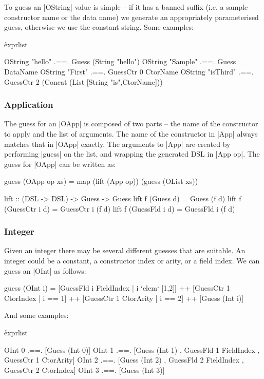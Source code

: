 \documentclass[preprint,draft]{sigplanconf}
\begin{document}
To guess an |OString| value is simple -- if it has a banned suffix (i.e. a sample constructor name or the data name) we generate an appropriately parameterised guess, otherwise we use the constant string. Some examples:

\h{exprlist}\begin{code}
OString "hello" .==. Guess (String "hello")
OString "Sample" .==. Guess DataName
OString "First" .==. GuessCtr 0 CtorName
OString "isThird" .==. GuessCtr 2
    (Concat (List [String "is",CtorName]))
\end{code}

\subsubsection{Application}

The guess for an |OApp| is composed of two parts -- the name of the constructor to apply and the list of arguments. The name of the constructor in |App| always matches that in |OApp| exactly. The arguments to |App| are created by performing |guess| on the list, and wrapping the generated DSL in |App op|. The guess for |OApp| can be written as:

\begin{code}
guess (OApp op xs) = map (lift (App op)) (guess (OList xs))

lift :: (DSL -> DSL) -> Guess -> Guess
lift f (Guess       d) = Guess       (f d)
lift f (GuessCtr i  d) = GuessCtr i  (f d)
lift f (GuessFld i  d) = GuessFld i  (f d)
\end{code}

\subsubsection{Integer}

Given an integer there may be several different guesses that are suitable. An integer could be a constant, a constructor index or arity, or a field index. We can guess an |OInt| as follows:

\begin{code}
guess (OInt i) =
    [GuessFld i FieldIndex | i `elem` [1,2]] ++
    [GuessCtr 1 CtorIndex | i == 1] ++
    [GuessCtr 1 CtorArity | i == 2] ++
    [Guess (Int i)]
\end{code}

\noindent And some examples:

\h{exprlist}\begin{code}
OInt 0 .==. [Guess (Int 0)]
OInt 1 .==. [Guess (Int 1)  , GuessFld 1 FieldIndex
                            , GuessCtr 1 CtorArity]
OInt 2 .==. [Guess (Int 2)  , GuessFld 2 FieldIndex
                            , GuessCtr 2 CtorIndex]
OInt 3 .==. [Guess (Int 3)]
\end{code}
\end{document}

